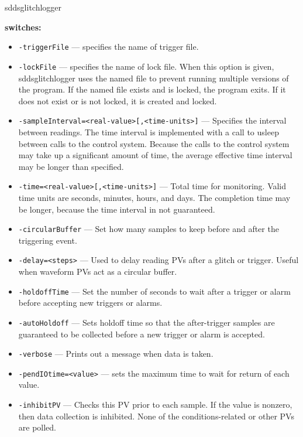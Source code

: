 \begin{sddsprog}{sddsglitchlogger}
\item \textbf{switches:}
    \begin{itemize}

        \item {\tt -triggerFile} --- specifies the name of trigger file.
        \item {\tt -lockFile} --- specifies the name of lock file. When this option is given,
                sddsglitchlogger uses the named file to prevent running multiple versions of
                the program.  If the named file exists and is locked, the program exits.  
                If it does not exist or is not locked, it is created and locked.
        \item {\tt -sampleInterval=<real-value>[,<time-units>]} --- Specifies the interval between readings.
                The time interval is implemented with a call to usleep between calls to the control system.
                Because the calls to the control system may take up a significant amount of time, the average
                effective time interval may be longer than specified.
        \item {\tt -time=<real-value>[,<time-units>]} --- Total time for monitoring. Valid time units are
                seconds, minutes, hours, and days. The completion time may be longer, because the time
                interval in not guaranteed.
        \item {\tt -circularBuffer} --- Set how many samples to keep before and after the triggering event.
        \item {\tt -delay=<steps>} --- Used to delay reading PVs after a glitch or trigger. Useful when
                waveform PVs act as a circular buffer.
        \item {\tt -holdoffTime} --- Set the number of seconds to wait after a trigger or alarm before
                accepting new triggers or alarms.
        \item {\tt -autoHoldoff} --- Sets holdoff time so that the after-trigger samples are guaranteed
                to be collected before a new trigger or alarm is accepted.
        \item {\tt -verbose} --- Prints out a message when data is taken.
        \item {\tt -pendIOtime=<value>} --- sets the maximum time to wait for return of each value.
        \item {\tt -inhibitPV} --- Checks this PV prior to each sample.  If the value is nonzero,
                then data collection is inhibited.  None of the conditions-related or other PVs are polled.

\end{itemize}
\end{sddsprog}
